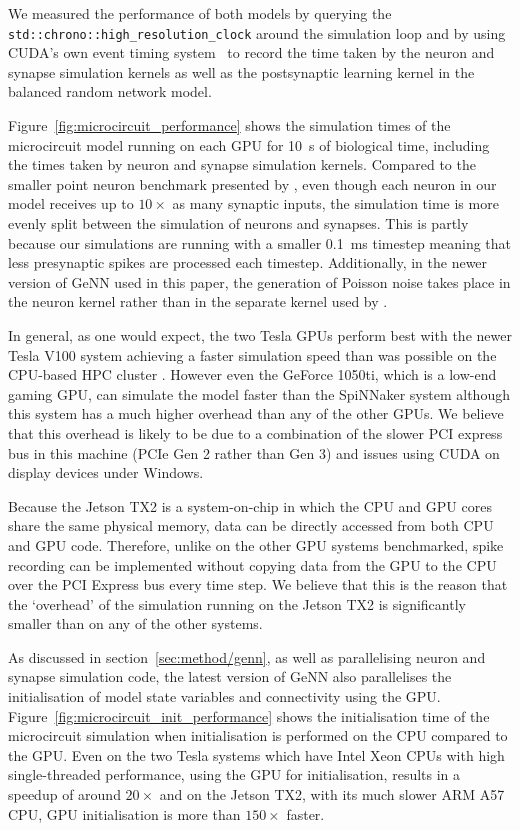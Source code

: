\documentclass[utf8]{frontiersSCNS} %
\begin{document}
We measured the performance of both models by querying the \lstinline{std::chrono::high_resolution_clock} around the simulation loop and by using CUDA's own event timing system~\citep[Section~3.2.5.6.2]{NVIDIACorporation2018} to record the time taken by the neuron and synapse simulation kernels as well as the postsynaptic learning kernel in the balanced random network model.

Figure~\ref{fig:microcircuit_performance} shows the simulation times of the microcircuit model running on each GPU for \SI{10}{\second} of biological time, including the times taken by neuron and synapse simulation kernels.
Compared to the smaller point neuron benchmark presented by \citet{Yavuz2016}, even though each neuron in our model receives up to $10\times$ as many synaptic inputs, the simulation time is more evenly split between the simulation of neurons and synapses.
This is partly because our simulations are running with a smaller \SI{0.1}{\milli\second} timestep meaning that less presynaptic spikes are processed each timestep.
Additionally, in the newer version of GeNN used in this paper, the generation of Poisson noise takes place in the neuron kernel rather than in the separate kernel used by \citeauthor{Yavuz2016}.

In general, as one would expect, the two Tesla GPUs perform best with the newer Tesla V100 system achieving a faster simulation speed than was possible on the CPU-based HPC cluster \citep{VanAlbada2018}.
However even the GeForce 1050ti, which is a low-end gaming GPU, can simulate the model faster than the SpiNNaker system although this system has a much higher overhead than any of the other GPUs.
We believe that this overhead is likely to be due to a combination of the slower PCI express bus in this machine (PCIe Gen 2 rather than Gen 3) and issues using CUDA on display devices under Windows.

Because the Jetson TX2 is a system-on-chip in which the CPU and GPU cores share the same physical memory, data can be directly accessed from both CPU and GPU code.
Therefore, unlike on the other GPU systems benchmarked, spike recording can be implemented without copying data from the GPU to the CPU over the PCI Express bus every time step.
We believe that this is the reason that the `overhead' of the simulation running on the Jetson TX2 is significantly smaller than on any of the other systems.

As discussed in section~\ref{sec:method/genn}, as well as parallelising neuron and synapse simulation code, the latest version of GeNN also parallelises the initialisation of model state variables and connectivity using the GPU.
Figure~\ref{fig:microcircuit_init_performance} shows the initialisation time of the microcircuit simulation when initialisation is performed on the CPU compared to the GPU.
Even on the two Tesla systems which have Intel Xeon CPUs with high single-threaded performance, using the GPU for initialisation, results in a speedup of around $20\times$ and on the Jetson TX2, with its much slower ARM A57 CPU, GPU initialisation is more than $150\times$ faster.
\end{document}
